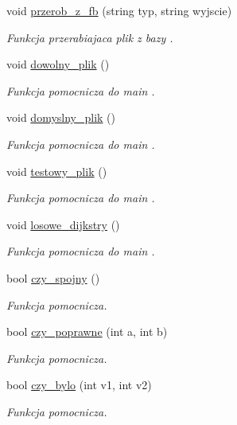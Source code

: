 \begin{DoxyCompactItemize}
void \hyperlink{class_graf_a7997ef54e93c3b83a2435bfd0d4c51c8}{przerob\-\_\-z\-\_\-fb} (string typ, string wyjscie)
\begin{DoxyCompactList}\small\item\em Funkcja przerabiajaca plik z bazy . \end{DoxyCompactList}\item 
void \hyperlink{class_graf_ab1baac77bf17276ab97c721536dc4f33}{dowolny\-\_\-plik} ()
\begin{DoxyCompactList}\small\item\em Funkcja pomocnicza do main . \end{DoxyCompactList}\item 
void \hyperlink{class_graf_a550437f8c2066ea035644502c93e1b7d}{domyslny\-\_\-plik} ()
\begin{DoxyCompactList}\small\item\em Funkcja pomocnicza do main . \end{DoxyCompactList}\item 
void \hyperlink{class_graf_a8a0677ac53fdef2117a52da0f944701a}{testowy\-\_\-plik} ()
\begin{DoxyCompactList}\small\item\em Funkcja pomocnicza do main . \end{DoxyCompactList}\item 
void \hyperlink{class_graf_aa66538b00c1915825b1e83339294c44e}{losowe\-\_\-dijkstry} ()
\begin{DoxyCompactList}\small\item\em Funkcja pomocnicza do main . \end{DoxyCompactList}\item 
bool \hyperlink{class_graf_ad83cd4b8656ccb75bd7b5f6cfe779080}{czy\-\_\-spojny} ()
\begin{DoxyCompactList}\small\item\em Funkcja pomocnicza. \end{DoxyCompactList}\item 
bool \hyperlink{class_graf_a2cefd6ebc3329cd029351d1509eadd7a}{czy\-\_\-poprawne} (int a, int b)
\begin{DoxyCompactList}\small\item\em Funkcja pomocnicza. \end{DoxyCompactList}\item 
bool \hyperlink{class_graf_a799ce938ca34db184e4ac0598f58398f}{czy\-\_\-bylo} (int v1, int v2)
\begin{DoxyCompactList}\small\item\em Funkcja pomocnicza. \end{DoxyCompactList}\item 

\end{DoxyCompactItemize}
